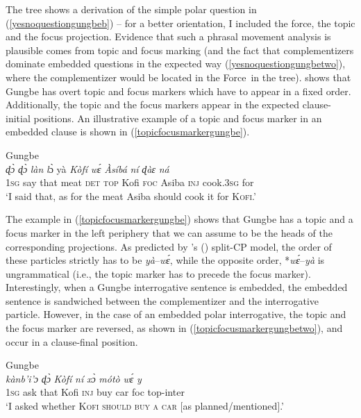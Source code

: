 
\noindent The tree shows a derivation of the simple polar question in (\ref{yesnoquestiongungbeb}) -- for a better orientation, I included the force, the topic and the focus projection. Evidence that such a phrasal movement analysis is plausible comes from topic and focus marking (and the fact that complementizers dominate embedded questions in the expected way (\ref{yesnoquestiongungbetwo}), where the complementizer would be located in the Force\textdegree\ in the tree). \citet{aboh2004left} shows that Gungbe has overt topic and focus markers which have to appear in a fixed order. Additionally, the topic and the focus markers appear in the expected clause-initial positions. An illustrative example of a topic and focus marker in an embedded clause is shown in (\ref{topicfocusmarkergungbe}).

\begin{exe}
\ex Gungbe \citep[168]{aboh2004left} \\ { {\textit{ɖɔ̀}} {\textit{ɖɔ̀}} {\textit{làn}} {\textit{l}ɔ̀} {yà} {\textit{Kòfí}} {\textit{wɛ́}} {\textit{Àsíbá}} {\textit{ní}} {\textit{ɖ}\textit{àɛ}} {\textit{n\'{a}}}  \\
{1\textsc{sg}} {say} {that} {meat} {\textsc{det}} {\textsc{top}} {Kofi} {\textsc{foc}} {Asiba} {\textsc{inj}} {cook.\textsc{3sg}} {for} \\
\trans `I said that, as for the meat Asiba should cook it for \textsc{Kofi}.' \label{topicfocusmarkergungbe} }
\end{exe}

\noindent The example in (\ref{topicfocusmarkergungbe}) shows that Gungbe has a topic and a focus marker in the left periphery that we can assume to be the heads of the corresponding projections. As predicted by \citeauthor{rizzi1997fine}'s (\citeyear{rizzi1997fine}) split-CP model, the order of these particles strictly has to be \textit{yà}--\textit{wɛ́}, while the opposite order, *\textit{wɛ́}--\textit{yà} is ungrammatical (i.e., the topic marker has to precede the focus marker). Interestingly, when a Gungbe interrogative sentence is embedded, the embedded sentence is sandwiched between the complementizer and the interrogative particle. However, in the case of an embedded polar interrogative, the topic and the focus marker are reversed, as shown in (\ref{topicfocusmarkergungbetwo}), and occur in a clause-final position. 

\begin{exe}
\ex Gungbe \citep[184]{aboh2004left} \\ { {\textit{kànb'{i}'{ɔ}}} {\textit{ɖɔ̀}} {\textit{Kòfí}} {\textit{ní}} {\textit{xɔ̀}} {\textit{mótò}} {\textit{wɛ́}} {\textit{y}}  \\
{1\textsc{sg}} {ask} {that} {Kofi} {\textsc{inj}} {buy} {car} {foc} {top-inter}  \\
\trans `I asked whether \textsc{Kofi should buy a car} $[$as planned/mentioned$]$.' \label{topicfocusmarkergungbetwo} }
\end{exe}


